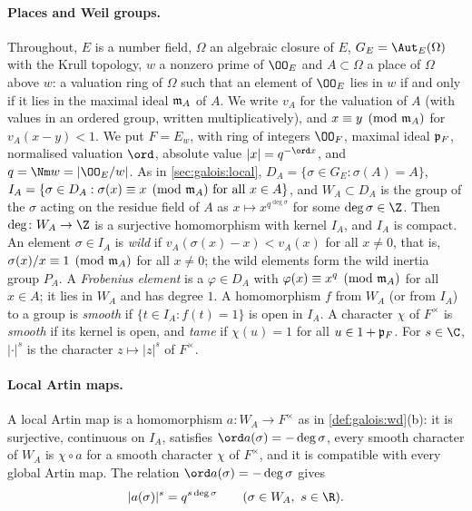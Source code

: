 \paragraph{Places and Weil groups.}
Throughout, $E$ is a number field, $\Omega$ an algebraic closure of $E$, $G_E=\Aut_E(\Omega)$ with the
Krull topology, $w$ a nonzero prime of $\OO_E$ and $A\subset\Omega$ a place of $\Omega$ above $w$: a
valuation ring of $\Omega$ such that an element of $\OO_E$ lies in $w$ if and only if it lies in the
maximal ideal $\mathfrak m_A$ of $A$. We write $v_A$ for the valuation of $A$ (with values in an ordered group,
written multiplicatively), and $x\equiv y\pmod{\mathfrak m_A}$ for $v_A(x-y)<1$. We put $F=E_w$, with ring of
integers $\OO_F$, maximal ideal $\mathfrak p_F$, normalised valuation $\ord$, absolute value
$|x|=q^{-\ord x}$, and $q=\Nm w=|\OO_E/w|$. As in \cref{sec:galois:local}, $D_A=\{\sigma\in G_E:\sigma(A)=A\}$,
$I_A=\{\sigma\in D_A:\sigma(x)\equiv x\pmod{\mathfrak m_A}\text{ for all }x\in A\}$, and $W_A\subset D_A$ is the
group of the $\sigma$ acting on the residue field of $A$ as $x\mapsto x^{q^{\deg\sigma}}$ for some
$\deg\sigma\in\Z$. Then $\deg\colon W_A\to\Z$ is a surjective homomorphism with kernel $I_A$, and $I_A$ is
compact. An element $\sigma\in I_A$ is \emph{wild} if $v_A(\sigma(x)-x)<v_A(x)$ for all $x\ne0$, that is,
$\sigma(x)/x\equiv1\pmod{\mathfrak m_A}$ for all $x\neq0$; the wild elements form the wild inertia group $P_A$.
A \emph{Frobenius element} is a $\varphi\in D_A$ with $\varphi(x)\equiv x^q\pmod{\mathfrak m_A}$ for all $x\in A$;
it lies in $W_A$ and has degree $1$. A homomorphism $f$ from $W_A$ (or from $I_A$) to a group is
\emph{smooth} if $\{t\in I_A:f(t)=1\}$ is open in $I_A$. A character $\chi$ of $F^\times$ is \emph{smooth}
if its kernel is open, and \emph{tame} if $\chi(u)=1$ for all $u\in1+\mathfrak p_F$. For $s\in\C$,
$|\cdot|^s$ is the character $z\mapsto|z|^s$ of $F^\times$.

\paragraph{Local Artin maps.} A local Artin map is a homomorphism $a\colon W_A\to F^\times$ as in
\cref{def:galois:wd}(b): it is surjective, continuous on $I_A$, satisfies $\ord a(\sigma)=-\deg\sigma$,
every smooth character of $W_A$ is $\chi\circ a$ for a smooth character $\chi$ of $F^\times$, and it is
compatible with every global Artin map. The relation $\ord a(\sigma)=-\deg\sigma$ gives
\begin{equation}\label{pf:llc:eq-abspow}
|a(\sigma)|^s=q^{s\deg\sigma}\qquad(\sigma\in W_A,\ s\in\R).
\end{equation}

